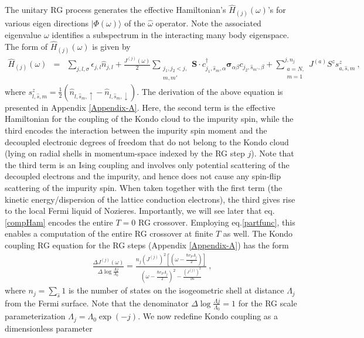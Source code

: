\documentclass[aps,prb,preprint,groupedaddress]{revtex4-2}
\begin{document}
The unitary RG process generates the effective Hamiltonian's $\hat{H}_{(j)}(\omega)$'s for various eigen directions $|\Phi(\omega)\rangle$
of the $\hat{\omega}$ operator. Note the associated eigenvalue $\omega$ identifies a subspectrum in the interacting many body eigenspace. The form of $\hat{H}_{(j)}(\omega)$ is given by
\begin{eqnarray}
\hat{H}_{(j)}(\omega) &=& \sum_{j,l,\sigma}\epsilon_{j,l}\hat{n}_{j,l}+\frac{J^{(j)}(\omega)}{2}\sum_{\substack{j_{1},j_{2}<j,\\ m,m'}}\mathbf{S}\cdot c^{\dagger}_{j_{1},\hat{s}_{m},\alpha}\boldsymbol{\sigma}_{\alpha\beta}c_{j_{2},\hat{s}_{m'},\beta}+\sum^{j,n_{j}}_{\substack{a=N,\\ m=1}}J^{(a)}S^{z}s^{z}_{a,\hat{s},m}~,
\label{compHam}
\end{eqnarray}
where  $s^{z}_{l,\hat{s},m}=\frac{1}{2}(\hat{n}_{l,\hat{s}_{m},\uparrow}-\hat{n}_{l,\hat{s}_{m},\downarrow})$. The derivation of the above equation is presented in Appendix \ref{Appendix-A}. Here, the second term is the effective Hamiltonian for the coupling of the Kondo cloud to the impurity spin, while the third encodes the interaction between the impurity spin moment and the decoupled electronic degrees of freedom that do not belong to the Kondo cloud (lying on radial shells in momentum-space indexed by the RG step $j$). Note that the third term is an Ising coupling and involves only potential scattering of the decoupled electrons and the impurity, and hence does not cause any spin-flip scattering of the impurity spin. When taken together with the first term (the kinetic energy/dispersion of the lattice conduction electrons), the third gives rise to the local Fermi liquid of Nozieres. Importantly, we will see later that eq.\eqref{compHam} encodes the entire $T=0$ RG crossover. Employing eq.\eqref{partfunc}, this enables a computation of the entire RG crossover at finite $T$ as well. The Kondo coupling RG equation for the RG steps (Appendix \ref{Appendix-A}) has the form
\begin{eqnarray}
\frac{\Delta J^{(j)}(\omega)}{\Delta\log\frac{\Lambda{j}}{\Lambda_{0}}}=\frac{n_{j}(J^{(j)})^{2}\left[(\omega - \frac{\hbar v_{F}\Lambda_{j}}{2})\right]}{(\omega - \frac{\hbar v_{F}\Lambda_{j}}{2})^{2}-\frac{\left(J^{(j)}\right)^{2}}{16}}~,\label{RGeqn}
\end{eqnarray}
where $n_{j}=\sum_{\hat{s}}1$ is the number of states on the isogeometric shell at distance $\Lambda_{j}$ from the Fermi surface. Note that the denominator $\Delta\log\frac{\Lambda{j}}{\Lambda_{0}} =1$ for the RG scale parameterization $\Lambda_{j}=\Lambda_{0}\exp(-j)$. We now redefine Kondo coupling as a dimensionless parameter
\end{document}
